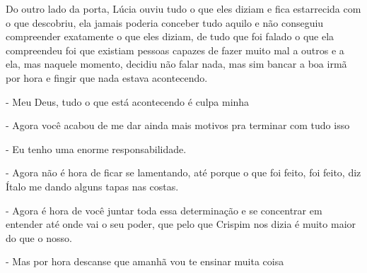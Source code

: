 Do outro lado da porta, Lúcia ouviu tudo o que eles diziam e fica estarrecida com o que descobriu, ela jamais poderia conceber tudo aquilo e não conseguiu compreender exatamente o que eles diziam, de tudo que foi falado o que ela compreendeu foi que existiam pessoas capazes de fazer muito mal a outros e a ela, mas naquele momento, decidiu não falar nada, mas sim bancar a boa irmã por hora e fingir que nada estava acontecendo.

- Meu Deus, tudo o que está acontecendo é culpa minha

- Agora você acabou de me dar ainda mais motivos pra terminar com tudo isso

- Eu tenho uma enorme responsabilidade.

- Agora não é hora de ficar se lamentando, até porque o que foi feito, foi feito, diz Ítalo me dando alguns tapas nas costas.

- Agora é hora de você juntar toda essa determinação e se concentrar em entender até onde vai o seu poder, que pelo que Crispim nos dizia é muito maior do que o nosso.

- Mas por hora descanse que amanhã vou te ensinar muita coisa




